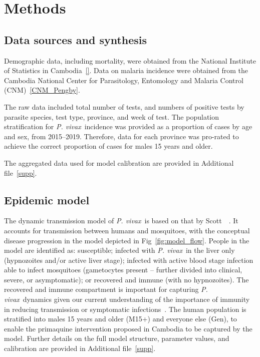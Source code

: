 \documentclass[doublespacing]{bmcart}
\newcommand{\pv}{\textit{P. vivax}}
\begin{document}
\section*{Methods} \label{sec:methods} %

\subsection*{Data sources and synthesis} 
Demographic data, including mortality, were obtained from the National Institute of Statistics in Cambodia~\ref{}. Data on malaria incidence were obtained from the Cambodia National Center for Parasitology, Entomology and Malaria Control (CNM)~\ref{CNM_Pengby}.

The raw data included total number of tests, and numbers of positive tests by parasite species, test type, province, and week of test. The population stratification for \pv~incidence was provided as a proportion of cases by age and sex, from 2015--2019. Therefore, data for each province was pro-rated to achieve the correct proportion of cases for males 15 years and older. 


The aggregated data used for model calibration are provided in Additional file~\ref{supp}.

\subsection*{Epidemic model}

The dynamic transmission model of \pv~is based on that by Scott~\etal~\cite{scott2017}. It accounts for transmission between humans and mosquitoes, with the conceptual disease progression in the model depicted in Fig~\ref{fig:model_flow}. People in the model are identified as: susceptible; infected with \pv~in the liver only (hypnozoites and/or active liver stage); infected with active blood stage infection able to infect mosquitoes (gametocytes present -- further divided into clinical, severe, or asymptomatic); or recovered and immune (with no hypnozoites). The recovered and immune compartment is important for capturing \pv~dynamics given our current understanding of the importance of immunity in reducing transmission or symptomatic infections~\cite{}. The human population is stratified into males 15 years and older (M15+) and everyone else (Gen), to enable the primaquine intervention proposed in Cambodia to be captured by the model. Further details on the full model structure, parameter values, and calibration are provided in Additional file~\ref{supp}.
\end{document}
